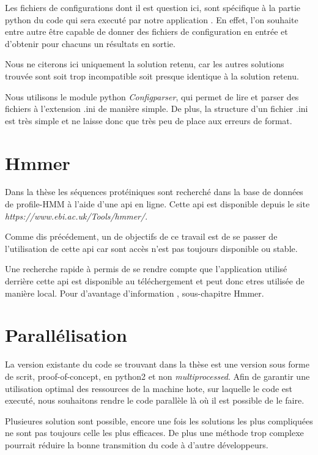 Les fichiers de configurations dont il est question ici, sont spécifique à la partie python du code qui sera executé par notre application . En effet, l'on souhaite entre autre être capable de donner des fichiers de configuration en entrée et d'obtenir pour chacuns un résultats en sortie.

Nous ne citerons ici uniquement la solution retenu, car les autres solutions trouvée sont soit trop incompatible soit presque identique à la solution retenu.

Nous utilisons le module python \emph{Configparser}, qui permet de lire et parser des fichiers à l'extension .ini de manière simple. De plus, la structure d'un fichier .ini est très simple et ne laisse donc que très peu de place aux erreurs de format.
 
 
\section{Hmmer}
Dans la thèse \thLeite les séquences protéiniques sont recherché dans la base de données de profile-HMM à l'aide d'une \gls{api} en ligne. Cette \gls{api} est disponible depuis le site \emph{https://www.ebi.ac.uk/Tools/hmmer/}. 

Comme dis précédement, un de objectifs de ce travail est de se passer de l'utilisation de cette \gls{api} car sont accès n'est pas toujours disponible ou stable.

Une recherche rapide à permis de se rendre compte que l'application utilisé derrière cette \gls{api} est disponible au téléchergement et peut donc etres utilisée de manière local. Pour d'avantage d'information , sous-chapitre Hmmer.


\section{Parallélisation}

La version existante du code se trouvant dans la thèse \thLeite est une version sous forme de scrit, proof-of-concept, en python2 et non \emph{multiprocessed}. Afin de garantir une utilisation optimal des ressources de la machine hote, sur laquelle le code est executé, nous souhaitons rendre le code parallèle là où il est possible de le faire.

Plusieures solution sont possible, encore une fois les solutions les plus compliquées ne sont pas toujours celle les plus efficaces. De plus une méthode trop complexe pourrait réduire la bonne transmition du code à d'autre développeurs.

